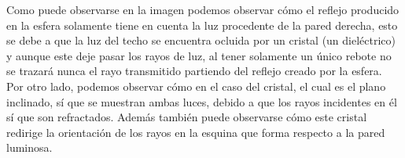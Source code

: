 \documentclass[10pt,oneside,a4paper]{article}
\begin{document}
 Como puede observarse en la imagen podemos observar cómo el reflejo producido en la esfera solamente tiene en cuenta la luz procedente de la pared derecha, esto se debe a que la luz del techo se encuentra ocluida por un cristal (un dieléctrico) y aunque este deje pasar los rayos de luz, al tener solamente un único rebote no se trazará nunca el rayo transmitido partiendo del reflejo creado por la esfera. Por otro lado, podemos observar cómo en el caso del cristal, el cual es el plano inclinado, sí que se muestran ambas luces, debido a que los rayos incidentes en él sí que son refractados. Además también puede observarse cómo este cristal redirige la orientación de los rayos en la esquina que forma respecto a la pared luminosa.
 
  
\end{document}
